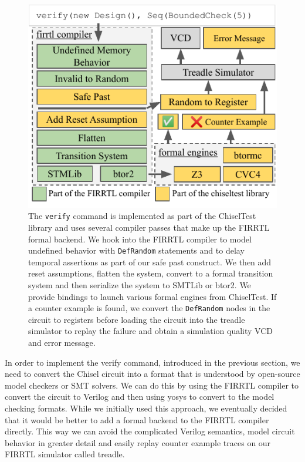 \documentclass[conference]{IEEEtran}
\newcommand{\code}[1]{{\small{\texttt{#1}}}}
\begin{document}
\begin{figure}[h]
\centering
\includegraphics{woset_verify_flow.pdf}
\caption{The \code{verify} command is implemented as part of the ChiselTest library and uses several compiler passes that make up the FIRRTL formal backend.
We hook into the FIRRTL compiler to model undefined behavior with \code{DefRandom} statements and to delay temporal assertions as part of our safe past construct.
We then add reset assumptions, flatten the system, convert to a formal transition system and then serialize the system to SMTLib or btor2.
We provide bindings to launch various formal engines from ChiselTest.
If a counter example is found, we convert the \code{DefRandom} nodes in the circuit to registers before loading the circuit into the treadle simulator
to replay the failure and obtain a simulation quality VCD and error message.}
\label{fig:verify-flow}
\end{figure}

In order to implement the verify command, introduced in the previous section, we need to convert the Chisel circuit into a format that is understood
by open-source model checkers or SMT solvers.
We can do this by using the FIRRTL compiler to convert the circuit to Verilog and then using yosys to convert to the
model checking formats.
While we initially used this approach, we eventually decided that it would be better to add a formal backend to the FIRRTL
compiler directly.
This way we can avoid the complicated Verilog semantics, model circuit behavior in greater detail and easily replay counter
example traces on our FIRRTL simulator called treadle.
\end{document}
